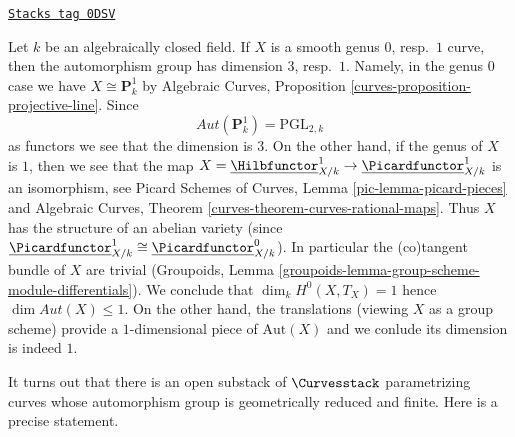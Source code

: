 \begin{example}

\label{moduli-curves-example-pos-dim}
\href{https://stacks.math.columbia.edu/tag/0DSV}{\texttt{Stacks tag 0DSV}}

Let $k$ be an algebraically closed field. If $X$ is a smooth
genus $0$, resp.\ $1$ curve, then the automorphism group has
dimension $3$, resp.\ $1$. Namely, in the genus $0$ case we have
$X \cong \mathbf{P}^1_k$ by Algebraic Curves, Proposition
\ref{curves-proposition-projective-line}. Since
$$
\mathit{Aut}(\mathbf{P}^1_k) = \text{PGL}_{2, k}
$$
as functors we see that the dimension is $3$. On the other hand,
if the genus of $X$ is $1$, then we see that the map
$X = \underline{\Hilbfunctor}^1_{X/k} \to
\underline{\Picardfunctor}^1_{X/k}$ is an isomorphism, see
Picard Schemes of Curves, Lemma \ref{pic-lemma-picard-pieces}
and
Algebraic Curves, Theorem \ref{curves-theorem-curves-rational-maps}.
Thus $X$ has the structure of an abelian variety
(since $\underline{\Picardfunctor}^1_{X/k} \cong
\underline{\Picardfunctor}^0_{X/k}$).
In particular the (co)tangent bundle of $X$ are trivial
(Groupoids, Lemma \ref{groupoids-lemma-group-scheme-module-differentials}).
We conclude that $\dim_k H^0(X, T_X) = 1$ hence
$\dim \mathit{Aut}(X) \leq 1$. On the other hand, the translations
(viewing $X$ as a group scheme) provide a $1$-dimensional
piece of $\text{Aut}(X)$ and we conlude its dimension is indeed $1$.
\end{example}

It turns out that there is an open substack of
$\Curvesstack$ parametrizing curves whose automorphism
group is geometrically reduced and finite.
Here is a precise statement.

